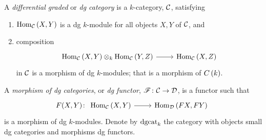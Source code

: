 \documentclass[dissertation.tex]{subfiles}
\begin{document}
\begin{defn}
  A {\it differential graded} or {\it dg category} is a $k$-category, $\mathcal{C}$, satisfying
  \begin{enumerate}
  \item
    $\operatorname{Hom}_{\mathcal{C}}\left(X,Y\right)$ is a dg $k$-module for all objects $X,Y$ of $\mathcal{C}$, and
  \item
    composition 
    $$\begin{tikzcd}
      \Hom{\C}{X,Y} \otimes_k \Hom{\C}{Y,Z} \arrow{r} & \Hom{\C}{X,Z}
    \end{tikzcd}$$
    in $\mathcal{C}$ is a morphism of dg $k$-modules;
    that is a morphism of $C\left(k\right)$.
  \end{enumerate}
  
  A {\it morphism of dg categories}, or {\it dg functor}, $\mathscr{F} \colon \mathcal{C} \rightarrow \mathcal{D}$, is a functor such that
  $$F(X,Y) \colon 
  \begin{tikzcd}
    \Hom{\C}{X,Y} \arrow{r} & \Hom{\D}{FX,FY}
  \end{tikzcd}$$
  is a morphism of dg $k$-modules.
  Denote by $\operatorname{dgcat}_k$ the category with objects small dg categories and morphisms dg functors.
\end{defn}
\end{document}
